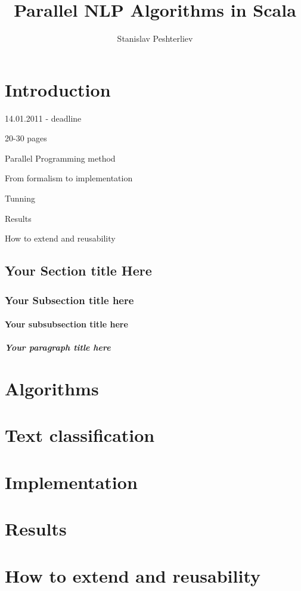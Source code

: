 \documentclass{report}
\author{Stanislav Peshterliev}
\title{Parallel NLP Algorithms in Scala}
\begin{document}
\maketitle

\tableofcontents

\chapter{Introduction}

14.01.2011 - deadline 

20-30 pages

Parallel Programming method

From formalism to implementation

Tunning

Results

How to extend and reusability

\cite{berger_a1-etal:1996a}
\cite{conf/nips/MannMMSW09}

\section{Your Section title Here}
\subsection{Your Subsection title here}
\subsubsection{Your subsubsection title here}
\paragraph{Your paragraph title here}

\chapter{Algorithms}

\chapter{Text classification}

\chapter{Implementation}

\chapter{Results}

\chapter{How to extend and reusability}

{}

\end{document}
